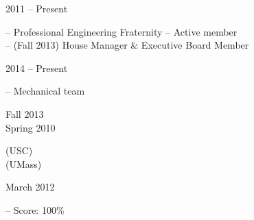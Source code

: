 
\flushleft \begin{minipage}[t]{\dateColWidth}
2011 -- Present
\end{minipage}
\begin{minipage}[t]{10 em}
\end{minipage}
\begin{minipage}[t]{0.6\textwidth} 
-- Professional Engineering Fraternity -- Active member \\
-- (Fall 2013) House Manager \& Executive Board Member
\end{minipage}

\flushleft \begin{minipage}[t]{\dateColWidth}
2014 -- Present
\end{minipage}
\begin{minipage}[t]{0.8\textwidth}
 -- Mechanical team
\end{minipage}

\flushleft \begin{minipage}[t]{\dateColWidth}
Fall 2013 \\
Spring 2010
\end{minipage}
\begin{minipage}[t]{0.8\textwidth}
 (USC) \\
 (UMass)
\end{minipage}

\flushleft \begin{minipage}[t]{\dateColWidth}
March 2012
\end{minipage}
\begin{minipage}[t]{0.8\textwidth}
 -- Score: 100\%
\end{minipage}
